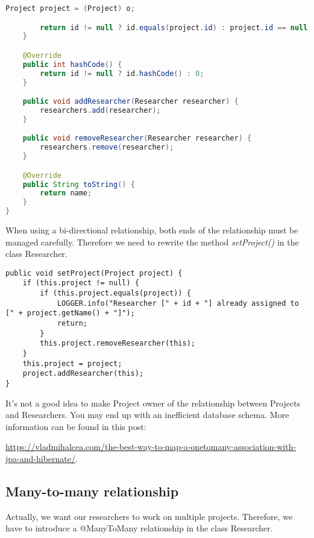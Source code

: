 \begin{lstlisting}[frame=single, language=java]
		Project project = (Project) o;

		return id != null ? id.equals(project.id) : project.id == null;
	}

	@Override
	public int hashCode() {
		return id != null ? id.hashCode() : 0;
	}

	public void addResearcher(Researcher researcher) {
		researchers.add(researcher);
	}

	public void removeResearcher(Researcher researcher) {
		researchers.remove(researcher);
	}

	@Override
	public String toString() {
		return name;
	}
}
\end{lstlisting}

When using a bi-directional relationship, both ends of the relationship must be managed carefully.
Therefore we need to rewrite the method \textit{setProject()} in the class Researcher.

\begin{lstlisting}
public void setProject(Project project) {
	if (this.project != null) {
		if (this.project.equals(project)) {
			LOGGER.info("Researcher [" + id + "] already assigned to [" + project.getName() + "]");
			return;
		}
		this.project.removeResearcher(this);
	}
	this.project = project;
	project.addResearcher(this);
}
\end{lstlisting}
 
It's not a good idea to make Project owner of the relationship between Projects and Researchers.  You may end up with an inefficient database schema. More information can be found in this post: 

\url{https://vladmihalcea.com/the-best-way-to-map-a-onetomany-association-with-jpa-and-hibernate/}.


\subsection{Many-to-many relationship}

Actually, we want our researchers to work on multiple projects. Therefore,  we have to introduce a @ManyToMany relationship in the class Researcher. 

